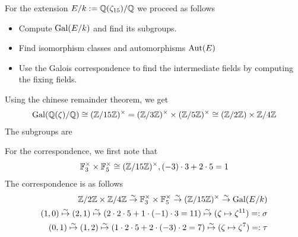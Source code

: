 \begin{ex}[]
  For the extension $E/k := \mathbb{Q}(\zeta_{15})/\mathbb{Q}$ we proceed as follows
  \begin{itemize}
    \item Compute $\operatorname{Gal}(E/k)$ and find its subgroups.
    \item Find isomorphism classes and automorphisms $\operatorname{Aut}(E)$
    \item Use the Galois correspondence to find the intermediate fields by computing the fixing fields.
  \end{itemize}
  Using the chinese remainder theorem, we get
  \begin{align*}
    \operatorname{Gal}(\mathbb{Q}(\zeta)/\mathbb{Q}) \cong (\mathbb{Z}/15 \mathbb{Z})^{\times} = (\mathbb{Z}/3\mathbb{Z})^{\times} \times (\mathbb{Z}/5\mathbb{Z})^{\times} \cong (\mathbb{Z}/2\mathbb{Z}) \times \mathbb{Z}/4\mathbb{Z}
  \end{align*}
  The subgroups are
  \begin{center}
  \end{center}
  For the correspondence, we first note that
  \begin{align*}
    \mathbb{F}_3^{\times} \times \mathbb{F}_5^{\times} \cong (\mathbb{Z}/15\mathbb{Z})^{\times}, (-3) \cdot 3 + 2 \cdot 5 = 1
  \end{align*}
  The correspondence is as follows
  \begin{align*}
    \Z/2\Z \times \Z/4\Z \stackrel{\sim}{\to} \F_3^{\times} \times \F_5^{\times} \stackrel{\sim}{\to} (\Z/15\Z)^{\times} \stackrel{\sim}{\to} \Gal(E/k)\\
    (1,0) \stackrel{\sim}{\mapsto} (2,1) \stackrel{\sim}{\mapsto} (2 \cdot 2 \cdot 5 + 1 \cdot (-1) \cdot 3 = 11) \stackrel{\sim}{\mapsto} (\zeta \mapsto \zeta^{11}) =: \sigma\\
    (0,1) \stackrel{\sim}{\mapsto} (1,2) \stackrel{\sim}{\mapsto} (1 \cdot 2 \cdot 5 + 2 \cdot (-3) \cdot 2 = 7) \stackrel{\sim}{\mapsto} (\zeta \mapsto \zeta^{7}) =: \tau

\end{align*}
\end{ex}
